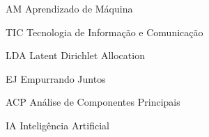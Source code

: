 \begin{siglas}
  \item[AM] Aprendizado de Máquina
  \item[TIC] Tecnologia de Informação e Comunicação
  \item[LDA] Latent Dirichlet Allocation
  \item[EJ] Empurrando Juntos
  \item[ACP] Análise de Componentes Principais
  \item[IA] Inteligência Artificial
\end{siglas}
